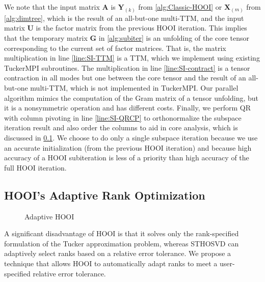     We note that the input matrix $\mathbf{A}$ is $\mathbf{Y}_{(k)}$ from
    \cref{alg:Classic-HOOI} or $\mathbf{X}_{(m)}$ from \cref{alg:dimtree},
    which is the result of an all-but-one multi-TTM, and the input matrix
    $\mathbf{U}$ is the factor matrix from the previous HOOI iteration. This implies
    that the temporary matrix $\mathbf{G}$ in \cref{alg:subiter} is an unfolding of
    the core tensor corresponding to the current set of factor matrices. That
    is, the matrix multiplication in line \ref{line:SI-TTM} is a TTM, which we
    implement using existing TuckerMPI subroutines. The multiplication in
    line \ref{line:SI-contract} is a tensor contraction in all modes but one between
    the core tensor and the result of an all-but-one multi-TTM, which is not
    implemented in TuckerMPI. Our parallel algorithm mimics the computation of
    the Gram matrix of a tensor unfolding, but it is a nonsymmetric operation
    and has different costs. Finally, we perform QR with column pivoting in
    line \ref{line:SI-QRCP} to orthonormalize the subspace iteration result and also
    order the columns to aid in core analysis, which is discussed in
    \cref{sec:HOOI's Adaptive Rank Optimization}. We choose to do only a single subspace iteration
    because we use an accurate initialization (from the previous HOOI iteration)
    and because high accuracy of a HOOI subiteration is less of a priority than
    high accuracy of the full HOOI iteration.

\subsection{HOOI's Adaptive Rank Optimization} \label{sec:HOOI's Adaptive Rank Optimization}

    \begin{figure}
        \centering
        
        \caption{Adaptive HOOI}
        \label{fig:adaptive_hooi}
    \end{figure}

    A significant disadvantage of HOOI is that it solves only the rank-specified
    formulation of the Tucker approximation problem, whereas STHOSVD can
    adaptively select ranks based on a relative error tolerance. We propose a
    technique that allows HOOI to automatically adapt ranks to meet a
    user-specified relative error tolerance. 

